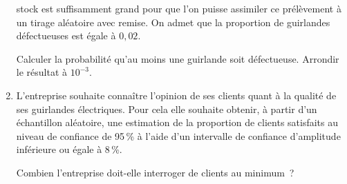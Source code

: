 \begin{enumerate}
     stock est suffisamment grand pour que l'on puisse assimiler ce prélèvement à un
     tirage aléatoire avec remise. On admet que la proportion de guirlandes
     défectueuses est égale à $0,02$.
     \par
     Calculer la probabilité qu'au moins une guirlande soit défectueuse. Arrondir le
     résultat à $10^{-3}$.
     \item L'entreprise souhaite connaître l'opinion de ses clients quant à la qualité de ses
     guirlandes électriques. Pour cela elle souhaite obtenir, à partir d'un échantillon
     aléatoire, une estimation de la proportion de clients satisfaits au niveau de
     confiance de 95\,\% à l'aide d'un intervalle de confiance d'amplitude inférieure ou
     égale à 8\,\%.
     \par
     Combien l'entreprise doit-elle interroger de clients au minimum~?
\end{enumerate}

